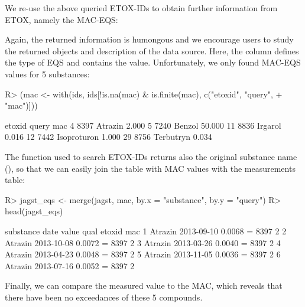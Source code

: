 \documentclass[article]{jss}
\begin{document}
We re-use the above queried ETOX-IDs to obtain further information
from ETOX, namely the MAC-EQS:
% 
\begin{CodeChunk}
\end{CodeChunk}
%
Again, the returned information is humongous and we encourage users to study the returned objects and description of the data source.
Here, the column  defines the type of EQS and  contains the value.
Unfortunately, we only found MAC-EQS values for 5 substances:
%
\begin{CodeChunk}
\begin{CodeInput}
R> (mac <- with(ids, ids[!is.na(mac) & is.finite(mac), c("etoxid", "query",
+    "mac")]))
\end{CodeInput}
\begin{CodeOutput}
   etoxid       query    mac
4    8397     Atrazin  2.000
5    7240      Benzol 50.000
11   8836     Irgarol  0.016
12   7442 Isoproturon  1.000
29   8756   Terbutryn  0.034
\end{CodeOutput}
\end{CodeChunk}
%
The  function used to search ETOX-IDs returns also
the original substance name (), so that we can easily join
the table with MAC values with the measurements table:
% 
\begin{CodeChunk}
\begin{CodeInput}
R> jagst_eqs <- merge(jagst, mac, by.x = "substance", by.y = "query")
R> head(jagst_eqs)
\end{CodeInput}
\begin{CodeOutput}
  substance       date  value qual etoxid mac
1   Atrazin 2013-09-10 0.0068    =   8397   2
2   Atrazin 2013-10-08 0.0072    =   8397   2
3   Atrazin 2013-03-26 0.0040    =   8397   2
4   Atrazin 2013-04-23 0.0048    =   8397   2
5   Atrazin 2013-11-05 0.0036    =   8397   2
6   Atrazin 2013-07-16 0.0052    =   8397   2
\end{CodeOutput}
\end{CodeChunk}
%
Finally, we can compare the measured value to the MAC, which reveals that there have been no exceedances of these 5 compounds.
\end{document}
